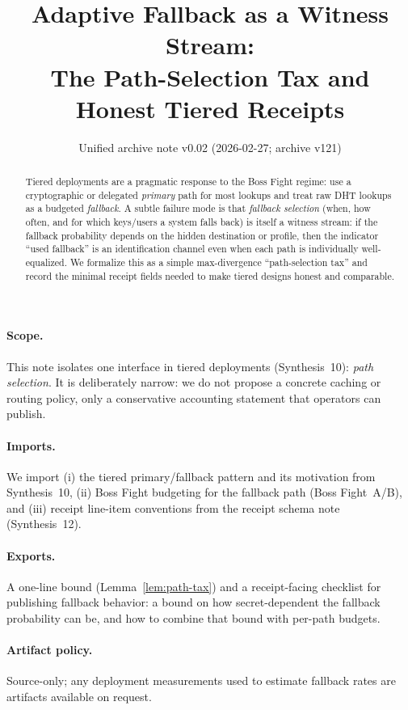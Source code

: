 \documentclass[11pt]{article}
\title{Adaptive Fallback as a Witness Stream:\\The Path-Selection Tax and Honest Tiered Receipts}
\author{}
\date{Unified archive note v0.02 (2026-02-27; archive v121)}
\begin{document}
\maketitle

\begin{abstract}
Tiered deployments are a pragmatic response to the Boss Fight regime:
use a cryptographic or delegated \emph{primary} path for most lookups and treat raw DHT lookups as a budgeted \emph{fallback}.
A subtle failure mode is that \emph{fallback selection} (when, how often, and for which keys/users a system falls back) is itself a witness stream:
if the fallback probability depends on the hidden destination or profile, then the indicator ``used fallback'' is an identification channel even when each path is individually well-equalized.
We formalize this as a simple max-divergence ``path-selection tax'' and record the minimal receipt fields needed to make tiered designs honest and comparable.
\end{abstract}

\paragraph{Scope.}
This note isolates one interface in tiered deployments (Synthesis~10): \emph{path selection}.
It is deliberately narrow: we do not propose a concrete caching or routing policy, only a conservative accounting statement that operators can publish.

\paragraph{Imports.}
We import (i) the tiered primary/fallback pattern and its motivation from Synthesis~10,\cite{series:tieredpattern}
(ii) Boss Fight budgeting for the fallback path (Boss Fight~A/B),\cite{series:bossfightA,series:bossfightB}
and (iii) receipt line-item conventions from the receipt schema note (Synthesis~12).\cite{series:receiptitems}

\paragraph{Exports.}
A one-line bound (Lemma~\ref{lem:path-tax}) and a receipt-facing checklist for publishing fallback behavior:
a bound on how secret-dependent the fallback probability can be, and how to combine that bound with per-path budgets.

\paragraph{Artifact policy.}
Source-only; any deployment measurements used to estimate fallback rates are artifacts available on request.\cite{series:artifactpolicy}
\end{document}
